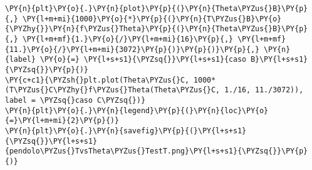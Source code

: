 \begin{Verbatim}[label=\makebox{\href{https://github.com/unipi-physics-labs/lab1-sheets/tree/main/snippy/plasduino_pendulum_testT.py}{https://github.com/.../plasduino\_pendulum\_testT.py}},commandchars=\\\{\}]
\PY{n}{plt}\PY{o}{.}\PY{n}{plot}\PY{p}{(}\PY{n}{Theta\PYZus{}B}\PY{p}{,} \PY{l+m+mi}{1000}\PY{o}{*}\PY{p}{(}\PY{n}{T\PYZus{}B}\PY{o}{\PYZhy{}}\PY{n}{f\PYZus{}Theta}\PY{p}{(}\PY{n}{Theta\PYZus{}B}\PY{p}{,} \PY{l+m+mf}{1.}\PY{o}{/}\PY{l+m+mi}{16}\PY{p}{,} \PY{l+m+mf}{11.}\PY{o}{/}\PY{l+m+mi}{3072}\PY{p}{)}\PY{p}{)}\PY{p}{,} \PY{n}{label} \PY{o}{=} \PY{l+s+s1}{\PYZsq{}}\PY{l+s+s1}{caso B}\PY{l+s+s1}{\PYZsq{}}\PY{p}{)}
\PY{c+c1}{\PYZsh{}plt.plot(Theta\PYZus{}C, 1000*(T\PYZus{}C\PYZhy{}f\PYZus{}Theta(Theta\PYZus{}C, 1./16, 11./3072)), label = \PYZsq{}caso C\PYZsq{})}
\PY{n}{plt}\PY{o}{.}\PY{n}{legend}\PY{p}{(}\PY{n}{loc}\PY{o}{=}\PY{l+m+mi}{2}\PY{p}{)}
\PY{n}{plt}\PY{o}{.}\PY{n}{savefig}\PY{p}{(}\PY{l+s+s1}{\PYZsq{}}\PY{l+s+s1}{pendolo\PYZus{}TvsTheta\PYZus{}TestT.png}\PY{l+s+s1}{\PYZsq{}}\PY{p}{)}
\end{Verbatim}
